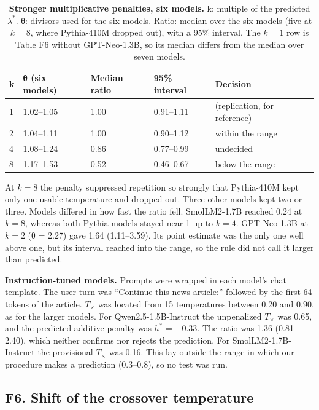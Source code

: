 \documentclass[aps,prx,onecolumn,superscriptaddress,longbibliography]{revtex4-2}
\begin{document}
\begin{table}[htbp]
\centering
\small
\setlength{\tabcolsep}{6pt}
\renewcommand{\thetable}{F7}
\caption{\textbf{Stronger multiplicative penalties, six models.} k: multiple of the predicted \(\lambda^*\). θ: divisors used for the six models. Ratio: median over the six models (five at \(k=8\), where Pythia-410M dropped out), with a 95\% interval. The \(k=1\) row is Table F6 without GPT-Neo-1.3B, so its median differs from the median over seven models.}
\label{tabF7}
\begin{tabular}{@{}lllll@{}}
\toprule
k & θ (six models) & Median ratio & 95\% interval & Decision \\
\midrule
1 & 1.02--1.05 & 1.00 & 0.91--1.11 & (replication, for reference) \\
2 & 1.04--1.11 & 1.00 & 0.90--1.12 & within the range \\
4 & 1.08--1.24 & 0.86 & 0.77--0.99 & undecided \\
8 & 1.17--1.53 & 0.52 & 0.46--0.67 & below the range \\
\bottomrule
\end{tabular}
\end{table}


At \(k=8\) the penalty suppressed repetition so strongly that Pythia-410M kept only one usable temperature and dropped out. Three other models kept two or three. Models differed in how fast the ratio fell. SmolLM2-1.7B reached 0.24 at \(k=8\), whereas both Pythia models stayed near 1 up to \(k=4\). GPT-Neo-1.3B at \(k=2\) (θ = 2.27) gave 1.64 (1.11--3.59). Its point estimate was the only one well above one, but its interval reached into the range, so the rule did not call it larger than predicted.

\textbf{Instruction-tuned models.} Prompts were wrapped in each model's chat template. The user turn was ``Continue this news article:'' followed by the first 64 tokens of the article. \(T_{\times}\) was located from 15 temperatures between 0.20 and 0.90, as for the larger models. For Qwen2.5-1.5B-Instruct the unpenalized \(T_{\times}\) was 0.65, and the predicted additive penalty was \(h^*\) = −0.33. The ratio was 1.36 (0.81--2.40), which neither confirms nor rejects the prediction. For SmolLM2-1.7B-Instruct the provisional \(T_{\times}\) was 0.16. This lay outside the range in which our procedure makes a prediction (0.3--0.8), so no test was run.

\subsection*{F6. Shift of the crossover temperature}
\end{document}
